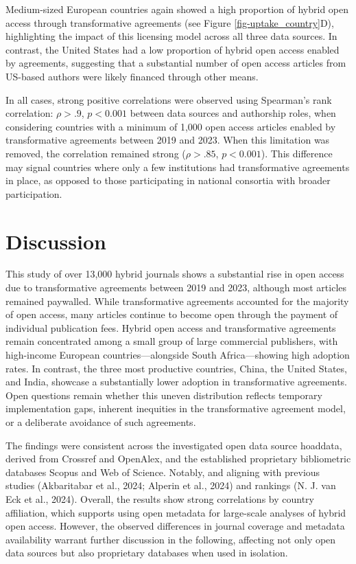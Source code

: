 \documentclass[a4paper,man,floatsintext,longtable,noextraspace,10pt]{apa6}
\begin{document}
Medium-sized European countries again showed a high proportion of hybrid
open access through transformative agreements (see Figure
\ref{fig-uptake_country}D), highlighting the impact of this licensing
model across all three data sources. In contrast, the United States had
a low proportion of hybrid open access enabled by agreements, suggesting
that a substantial number of open access articles from US-based authors
were likely financed through other means.

In all cases, strong positive correlations were observed using
Spearman's rank correlation: \(\rho > .9\), \(p < 0.001\) between data
sources and authorship roles, when considering countries with a minimum
of 1,000 open access articles enabled by transformative agreements
between 2019 and 2023. When this limitation was removed, the correlation
remained strong (\(\rho > .85\), \(p < 0.001\)). This difference may
signal countries where only a few institutions had transformative
agreements in place, as opposed to those participating in national
consortia with broader participation.

\section{Discussion}\label{discussion}

This study of over 13,000 hybrid journals shows a substantial rise in
open access due to transformative agreements between 2019 and 2023,
although most articles remained paywalled. While transformative
agreements accounted for the majority of open access, many articles
continue to become open through the payment of individual publication
fees. Hybrid open access and transformative agreements remain
concentrated among a small group of large commercial publishers, with
high-income European countries---alongside South Africa---showing high
adoption rates. In contrast, the three most productive countries, China,
the United States, and India, showcase a substantially lower adoption in
transformative agreements. Open questions remain whether this uneven
distribution reflects temporary implementation gaps, inherent inequities
in the transformative agreement model, or a deliberate avoidance of such
agreements.

The findings were consistent across the investigated open data source
hoaddata, derived from Crossref and OpenAlex, and the established
proprietary bibliometric databases Scopus and Web of Science. Notably,
and aligning with previous studies (Akbaritabar et al., 2024; Alperin et
al., 2024) and rankings (N. J. van Eck et al., 2024). Overall, the
results show strong correlations by country affiliation, which supports
using open metadata for large-scale analyses of hybrid open access.
However, the observed differences in journal coverage and metadata
availability warrant further discussion in the following, affecting not
only open data sources but also proprietary databases when used in
isolation.
\end{document}
